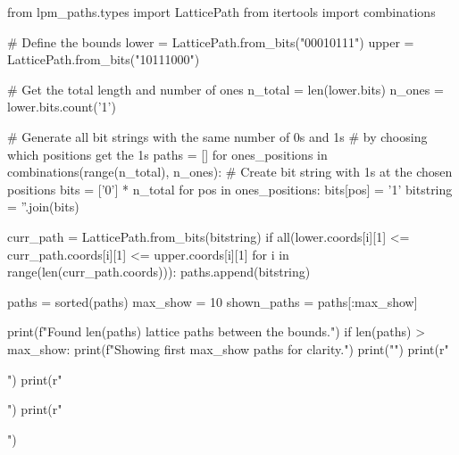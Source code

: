 \documentclass{article}
\begin{document}
\begin{pycode}
from lpm_paths.types import LatticePath
from itertools import combinations

# Define the bounds
lower = LatticePath.from_bits("00010111")
upper = LatticePath.from_bits("10111000")

# Get the total length and number of ones
n_total = len(lower.bits)
n_ones = lower.bits.count('1')

# Generate all bit strings with the same number of 0s and 1s
# by choosing which positions get the 1s
paths = []
for ones_positions in combinations(range(n_total), n_ones):
    # Create bit string with 1s at the chosen positions
    bits = ['0'] * n_total
    for pos in ones_positions:
        bits[pos] = '1'
    bitstring = ''.join(bits)
    
    curr_path = LatticePath.from_bits(bitstring)
    if all(lower.coords[i][1] <= curr_path.coords[i][1] <= upper.coords[i][1]
           for i in range(len(curr_path.coords))):
        paths.append(bitstring)

paths = sorted(paths)
max_show = 10
shown_paths = paths[:max_show]

print(f"Found {len(paths)} lattice paths between the bounds.")
if len(paths) > max_show:
    print(f"Showing first {max_show} paths for clarity.")
print("")
print(r"\begin{center}")
print(r"")
print(r"\end{center}")
\end{pycode}
\end{document}
